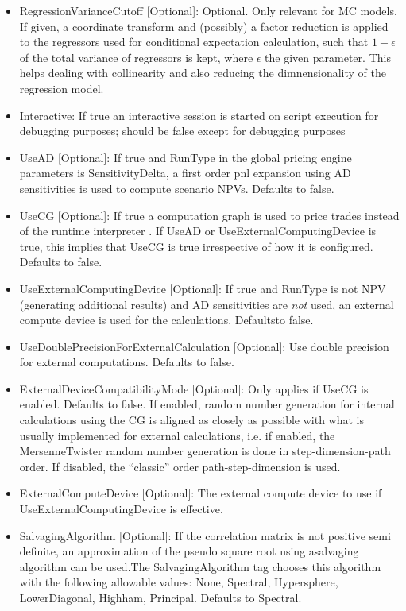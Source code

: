 \begin{itemize}
\item RegressionVarianceCutoff [Optional]: Optional. Only relevant for MC models. If given, a coordinate transform and
  (possibly) a factor reduction is applied to the regressors used for conditional expectation calculation, such that
  $1-\epsilon$ of the total variance of regressors is kept, where $\epsilon$ the given parameter. This helps dealing
  with collinearity and also reducing the dimnensionality of the regression model.
\item Interactive: If true an interactive session is started on script execution for debugging purposes; should be false
  except for debugging purposes
\item UseAD [Optional]: If true and RunType in the global pricing engine parameters is SensitivityDelta, a first order
  pnl expansion using AD sensitivities is used to compute scenario NPVs. Defaults to false.
\item UseCG [Optional]: If true a computation graph is used to price trades instead of the runtime interpreter . If
  UseAD or UseExternalComputingDevice is true, this implies that UseCG is true irrespective of how it is
  configured. Defaults to false.
\item UseExternalComputingDevice [Optional]: If true and RunType is not NPV (generating additional results) and AD
  sensitivities are {\em not} used, an external compute device is used for the calculations. Defaultsto false.
\item UseDoublePrecisionForExternalCalculation [Optional]: Use double precision for external computations. Defaults to
  false.
\item ExternalDeviceCompatibilityMode [Optional]: Only applies if UseCG is enabled. Defaults to false. If enabled,
  random number generation for internal calculations using the CG is aligned as closely as possible with what is usually
  implemented for external calculations, i.e. if enabled, the MersenneTwister random number generation is done in
  step-dimension-path order. If disabled, the ``classic'' order path-step-dimension is used.
\item ExternalComputeDevice [Optional]: The external compute device to use if UseExternalComputingDevice is effective.
\item SalvagingAlgorithm [Optional]: If the correlation matrix is not positive semi definite, an approximation of the
  pseudo square root using asalvaging algorithm can be used.The SalvagingAlgorithm tag chooses this algorithm with the
  following allowable values: None, Spectral, Hypersphere, LowerDiagonal, Highham, Principal. Defaults to Spectral.

\end{itemize}
